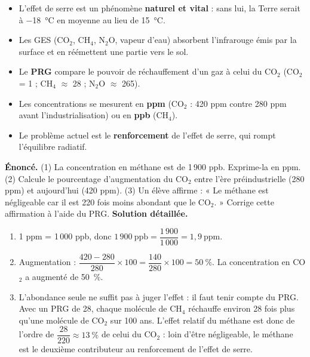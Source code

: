 \documentclass[11pt]{article}
\begin{document}
\begin{aretenir}
\begin{itemize}
\item L'effet de serre est un phénomène \textbf{naturel et vital} : sans lui, la Terre serait à \SI{-18}{\celsius} en moyenne au lieu de \SI{15}{\celsius}.
\item Les GES (CO$_2$, CH$_4$, N$_2$O, vapeur d'eau) absorbent l'infrarouge émis par la surface et en réémettent une partie vers le sol.
\item Le \textbf{PRG} compare le pouvoir de réchauffement d'un gaz à celui du CO$_2$ (CO$_2$ = 1 ; CH$_4$ $\approx$ 28 ; N$_2$O $\approx$ 265).
\item Les concentrations se mesurent en \textbf{ppm} (CO$_2$ : 420 ppm contre 280 ppm avant l'industrialisation) ou en \textbf{ppb} (CH$_4$).
\item Le problème actuel est le \textbf{renforcement} de l'effet de serre, qui rompt l'équilibre radiatif.
\end{itemize}
\end{aretenir}

\begin{exoresolu}
\textbf{Énoncé.} (1) La concentration en méthane est de 1\,900 ppb. Exprime-la en ppm. (2) Calcule le pourcentage d'augmentation du CO$_2$ entre l'ère préindustrielle (280 ppm) et aujourd'hui (420 ppm). (3) Un élève affirme : « Le méthane est négligeable car il est 220 fois moins abondant que le CO$_2$. » Corrige cette affirmation à l'aide du PRG.
\tcblower
\textbf{Solution détaillée.}
\begin{enumerate}
\item 1 ppm = 1\,000 ppb, donc $1\,900\ \text{ppb} = \dfrac{1\,900}{1\,000} = 1{,}9\ \text{ppm}$.
\item Augmentation : $\dfrac{420 - 280}{280} \times 100 = \dfrac{140}{280} \times 100 = \SI{50}{\percent}$. La concentration en CO$_2$ a augmenté de \SI{50}{\percent}.
\item L'abondance seule ne suffit pas à juger l'effet : il faut tenir compte du PRG. Avec un PRG de 28, chaque molécule de CH$_4$ réchauffe environ 28 fois plus qu'une molécule de CO$_2$ sur 100 ans. L'effet relatif du méthane est donc de l'ordre de $\dfrac{28}{220} \approx \SI{13}{\percent}$ de celui du CO$_2$ : loin d'être négligeable, le méthane est le deuxième contributeur au renforcement de l'effet de serre.
\end{enumerate}
\end{exoresolu}
\end{document}
